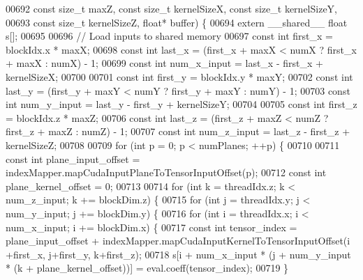 \begin{DoxyCode}
00692     \textcolor{keyword}{const} \textcolor{keywordtype}{size\_t} maxZ, \textcolor{keyword}{const} \textcolor{keywordtype}{size\_t} kernelSizeX, \textcolor{keyword}{const} \textcolor{keywordtype}{size\_t} kernelSizeY,
00693     \textcolor{keyword}{const} \textcolor{keywordtype}{size\_t} kernelSizeZ, \textcolor{keywordtype}{float}* buffer) \{
00694   \textcolor{keyword}{extern} \_\_shared\_\_ \textcolor{keywordtype}{float} s[];
00695 
00696   \textcolor{comment}{// Load inputs to shared memory}
00697   \textcolor{keyword}{const} \textcolor{keywordtype}{int} first\_x = blockIdx.x * maxX;
00698   \textcolor{keyword}{const} \textcolor{keywordtype}{int} last\_x = (first\_x + maxX < numX ? first\_x + maxX : numX) - 1;
00699   \textcolor{keyword}{const} \textcolor{keywordtype}{int} num\_x\_input = last\_x - first\_x + kernelSizeX;
00700 
00701   \textcolor{keyword}{const} \textcolor{keywordtype}{int} first\_y = blockIdx.y * maxY;
00702   \textcolor{keyword}{const} \textcolor{keywordtype}{int} last\_y = (first\_y + maxY < numY ? first\_y + maxY : numY) - 1;
00703   \textcolor{keyword}{const} \textcolor{keywordtype}{int} num\_y\_input = last\_y - first\_y + kernelSizeY;
00704 
00705   \textcolor{keyword}{const} \textcolor{keywordtype}{int} first\_z = blockIdx.z * maxZ;
00706   \textcolor{keyword}{const} \textcolor{keywordtype}{int} last\_z = (first\_z + maxZ < numZ ? first\_z + maxZ : numZ) - 1;
00707   \textcolor{keyword}{const} \textcolor{keywordtype}{int} num\_z\_input = last\_z - first\_z + kernelSizeZ;
00708 
00709   \textcolor{keywordflow}{for} (\textcolor{keywordtype}{int} p = 0; p < numPlanes; ++p) \{
00710 
00711     \textcolor{keyword}{const} \textcolor{keywordtype}{int} plane\_input\_offset = indexMapper.mapCudaInputPlaneToTensorInputOffset(p);
00712     \textcolor{keyword}{const} \textcolor{keywordtype}{int} plane\_kernel\_offset = 0;
00713 
00714     \textcolor{keywordflow}{for} (\textcolor{keywordtype}{int} k = threadIdx.z; k < num\_z\_input; k += blockDim.z) \{
00715       \textcolor{keywordflow}{for} (\textcolor{keywordtype}{int} j = threadIdx.y; j < num\_y\_input; j += blockDim.y) \{
00716         \textcolor{keywordflow}{for} (\textcolor{keywordtype}{int} i = threadIdx.x; i < num\_x\_input; i += blockDim.x) \{
00717           \textcolor{keyword}{const} \textcolor{keywordtype}{int} tensor\_index = plane\_input\_offset + indexMapper.mapCudaInputKernelToTensorInputOffset(i
      +first\_x, j+first\_y, k+first\_z);
00718           s[i + num\_x\_input * (j + num\_y\_input * (k + plane\_kernel\_offset))] = eval.coeff(tensor\_index);
00719         \}

\end{DoxyCode}
